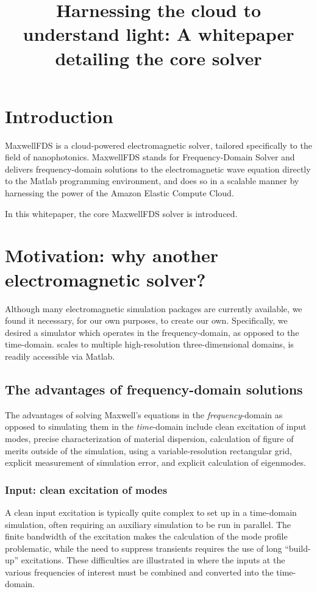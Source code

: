 \documentclass{article}
\title{Harnessing the cloud to understand light: 
        A whitepaper detailing the \MaxwellFDS core solver}
\newcommand{\MaxwellFDS}{MaxwellFDS }
\begin{document}
\maketitle
\tableofcontents

\section*{Introduction}
\MaxwellFDS is a cloud-powered electromagnetic solver,
    tailored specifically to the field of nanophotonics.
\MaxwellFDS stands for Frequency-Domain Solver
    and delivers frequency-domain solutions to the electromagnetic wave equation
    directly to the Matlab programming environment,
    and does so in a scalable manner by harnessing the power
    of the Amazon Elastic Compute Cloud.

In this whitepaper, the core \MaxwellFDS solver is introduced.


\section{Motivation: why another electromagnetic solver?}
Although many electromagnetic simulation packages are currently available,
    we found it necessary, for our own purposes, to create our own.
Specifically, we desired a simulator which 
    \BI operates in the frequency-domain, as opposed to the time-domain.
    \I  scales to multiple high-resolution three-dimensional domains,
    \I  is readily accessible via Matlab. \EI

\subsection{The advantages of frequency-domain solutions}
The advantages of solving Maxwell's equations in the  \emph{frequency}-domain 
    as opposed to simulating them in the \emph{time}-domain include
    \BI clean excitation of input modes,
    \I  precise characterization of material dispersion,
    \I  calculation of figure of merits outside of the simulation,
    \I  using a variable-resolution rectangular grid,
    \I  explicit measurement of simulation error, and
    \I  explicit calculation of eigenmodes. \EI

\subsubsection{Input: clean excitation of modes}
A clean input excitation is typically quite complex to set up
    in a time-domain simulation,
    often requiring an auxiliary simulation to be run in parallel.
The finite bandwidth of the excitation makes the calculation
    of the mode profile problematic, while
    the need to suppress transients requires the use of 
    long ``build-up'' excitations.
These difficulties are illustrated in 
    where the inputs at the various frequencies of interest
    must be combined and converted into the time-domain.
\end{document}
